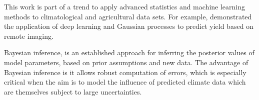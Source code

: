 \documentclass[12pt]{iopart}
\newcommand{\remove}[1]{}
\newcommand{\add}[1]{#1}
\begin{document}










This work is part of a trend to apply advanced statistics and machine learning methods to climatological and agricultural data sets. For example, \citet{you:2017} demonstrated the application of deep learning and Gaussian processes to predict yield based on remote imaging. 

Bayesian inference, is an established approach for inferring the posterior values of model parameters, based on prior assumptions and new data. The advantage of Bayesian inference is it allows robust computation of errors, which is especially critical when the aim is to model the influence of predicted climate data which are themselves subject to large uncertainties. 
\end{document}
